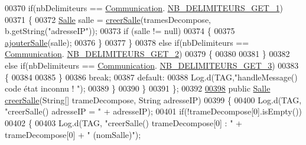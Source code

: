 \begin{DoxyCode}
00370                     \textcolor{keywordflow}{if}(nbDelimiteurs == \hyperlink{classcom_1_1lasalle_1_1meeting_1_1_communication}{Communication}.
      \hyperlink{classcom_1_1lasalle_1_1meeting_1_1_communication_a28886dc20c115ada2e1e3ee745805643}{NB\_DELIMITEURS\_GET\_1})
00371                     \{
00372                         \hyperlink{classcom_1_1lasalle_1_1meeting_1_1_salle}{Salle} salle = \hyperlink{classcom_1_1lasalle_1_1meeting_1_1_main_activity_a882bcd3e88633b5190d60625bb70dd43}{creerSalle}(tramesDecompose, b.getString(\textcolor{stringliteral}{"adresseIP"}));
00373                         \textcolor{keywordflow}{if} (salle != null)
00374                         \{
00375                             \hyperlink{classcom_1_1lasalle_1_1meeting_1_1_main_activity_a8fded0b03a19faea1b0e735af1aa52ca}{ajouterSalle}(salle);
00376                         \}
00377                     \}
00378                     \textcolor{keywordflow}{else} \textcolor{keywordflow}{if}(nbDelimiteurs == \hyperlink{classcom_1_1lasalle_1_1meeting_1_1_communication}{Communication}.
      \hyperlink{classcom_1_1lasalle_1_1meeting_1_1_communication_a872d0590c8f9a71ed87484474a0c1070}{NB\_DELIMITEURS\_GET\_2})
00379                     \{
00380 
00381                     \}
00382                     \textcolor{keywordflow}{else} \textcolor{keywordflow}{if}(nbDelimiteurs == \hyperlink{classcom_1_1lasalle_1_1meeting_1_1_communication}{Communication}.
      \hyperlink{classcom_1_1lasalle_1_1meeting_1_1_communication_aa5881937f7ed66ade03b1eb16386ca9b}{NB\_DELIMITEURS\_GET\_3})
00383                     \{
00384 
00385                     \}
00386                     \textcolor{keywordflow}{break};
00387                 \textcolor{keywordflow}{default}:
00388                     Log.d(TAG,\textcolor{stringliteral}{"handleMessage() code état inconnu ! "});
00389             \}
00390         \}
00391     \};
00392 
\hyperlink{classcom_1_1lasalle_1_1meeting_1_1_main_activity_a882bcd3e88633b5190d60625bb70dd43}{00398}     \textcolor{keyword}{public} \hyperlink{classcom_1_1lasalle_1_1meeting_1_1_salle}{Salle} \hyperlink{classcom_1_1lasalle_1_1meeting_1_1_main_activity_a882bcd3e88633b5190d60625bb70dd43}{creerSalle}(String[] trameDecompose, String adresseIP)
00399     \{
00400         Log.d(TAG, \textcolor{stringliteral}{"creerSalle() adresseIP = "} + adresseIP);
00401         \textcolor{keywordflow}{if}(!trameDecompose[0].isEmpty())
00402         \{
00403             Log.d(TAG, \textcolor{stringliteral}{"creerSalle() trameDecompose[0] : "} + trameDecompose[0] + \textcolor{stringliteral}{" (nomSalle)"});

\end{DoxyCode}
